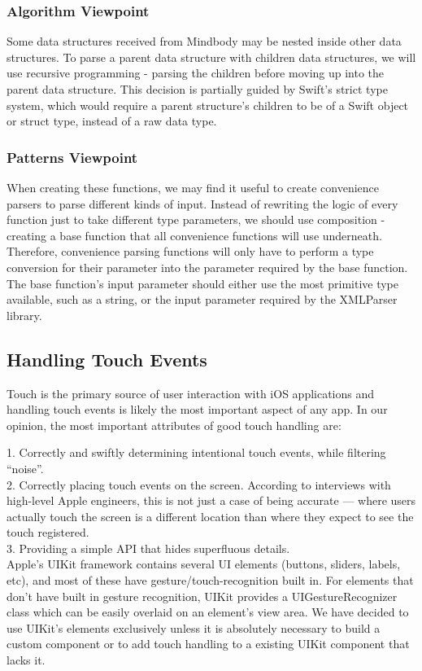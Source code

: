 \documentclass[letterpaper,10pt,titlepage]{article}
\begin{document}
\subsubsection{Algorithm Viewpoint}
Some data structures received from Mindbody may be nested inside other data structures. To parse a parent data structure with children data structures, we will use recursive programming - parsing the children before moving up into the parent data structure. This decision is partially guided by Swift's strict type system, which would require a parent structure's children to be of a Swift object or struct type, instead of a raw data type.

\subsubsection{Patterns Viewpoint}
When creating these functions, we may find it useful to create convenience parsers to parse different kinds of input. Instead of rewriting the logic of every function just to take different type parameters, we should use composition - creating a base function that all convenience functions will use underneath. Therefore, convenience parsing functions will only have to perform a type conversion for their parameter into the parameter required by the base function. The base function's input parameter should either use the most primitive type available, such as a string, or the input parameter required by the XMLParser library.


\subsection{Handling Touch Events}
Touch is the primary source of user interaction with iOS applications and handling touch events is likely the most important aspect of any app. In our opinion, the most important attributes of good touch handling are:

1. Correctly and swiftly determining intentional touch events, while filtering “noise”.\\
2. Correctly placing touch events on the screen. According to interviews with high-level Apple engineers\cite{touchpara1}, this is not just a case of being accurate — where users actually touch the screen is a different location than where they expect to see the touch registered.\\
3. Providing a simple API that hides superfluous details.\\

Apple’s UIKit framework contains several UI elements (buttons, sliders, labels, etc), and most of these have gesture/touch-recognition built in. For elements that don’t have built in gesture recognition, UIKit provides a UIGestureRecognizer class which can be easily overlaid on an element’s view area.
We have decided to use UIKit's elements exclusively unless it is absolutely necessary to build a custom component or to add touch handling to a existing UIKit component that lacks it.
\end{document}
